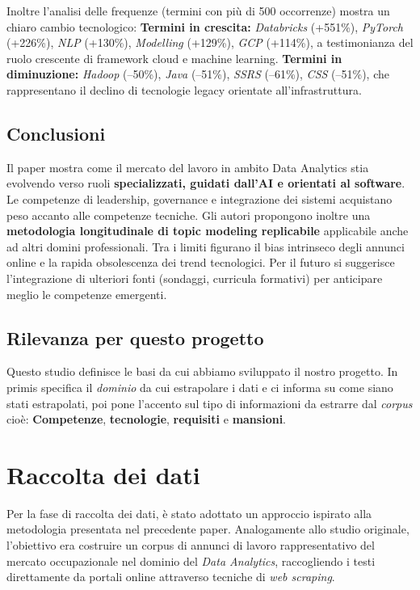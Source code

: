 Inoltre l'analisi delle frequenze (termini con più di 500 occorrenze) mostra un chiaro cambio tecnologico:
\noindent \textbf{Termini in crescita:} \textit{Databricks} (+551\%), \textit{PyTorch} (+226\%), \textit{NLP} (+130\%), \textit{Modelling} (+129\%), \textit{GCP} (+114\%), a testimonianza del ruolo crescente di framework cloud e machine learning.
\noindent \textbf{Termini in diminuzione:} \textit{Hadoop} (--50\%), \textit{Java} (--51\%), \textit{SSRS} (--61\%), \textit{CSS} (--51\%), che rappresentano il declino di tecnologie legacy orientate all'infrastruttura.

\subsection{Conclusioni}
Il paper mostra come il mercato del lavoro in ambito Data Analytics stia evolvendo verso ruoli \textbf{specializzati, guidati dall'AI e orientati al software}.
Le competenze di leadership, governance e integrazione dei sistemi acquistano peso accanto alle competenze tecniche.
Gli autori propongono inoltre una \textbf{metodologia longitudinale di topic modeling replicabile} applicabile anche ad altri domini professionali.
Tra i limiti figurano il bias intrinseco degli annunci online e la rapida obsolescenza dei trend tecnologici.
Per il futuro si suggerisce l'integrazione di ulteriori fonti (sondaggi, curricula formativi) per anticipare meglio le competenze emergenti.

\subsection{Rilevanza per questo progetto}
Questo studio definisce le basi da cui abbiamo sviluppato il nostro progetto. In primis specifica il \textit{dominio} da cui estrapolare i dati e ci informa su come siano stati estrapolati, poi pone l'accento sul tipo di informazioni da estrarre dal \textit{corpus} cioè: \textbf{Competenze}, \textbf{tecnologie}, \textbf{requisiti} e \textbf{mansioni}.
\section{Raccolta dei dati}

Per la fase di raccolta dei dati, è stato adottato un approccio ispirato alla metodologia presentata nel precedente paper.  
Analogamente allo studio originale, l’obiettivo era costruire un corpus di annunci di lavoro rappresentativo del mercato occupazionale nel dominio del \textit{Data Analytics}, raccogliendo i testi direttamente da portali online attraverso tecniche di \textit{web scraping}.

